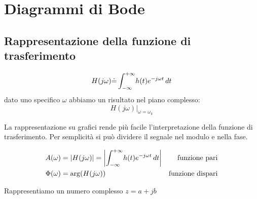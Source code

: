 
\chapter{Diagrammi di Bode}
\section{Rappresentazione della funzione di trasferimento}



\begin{equation}
	H(j\omega) \dot{=}\int_{-\infty}^{+\infty} \! h(t)e^{-j\omega t} \, d t
\end{equation}
dato uno specifico $\omega$ abbiamo un risultato nel piano complesso:
\[
	H(j\omega) \big\vert_{\omega = \omega_k}
\]


La rappresentazione su grafici rende più facile l'interpretazione della funzione di trasferimento. Per semplicità si può dividere il segnale nel modulo e nella fase.


\begin{align}
 A(\omega)&=\abs{H(j\omega)}=\Abs{\int_{-\infty}^{+\infty} \! h(t)e^{-j\omega t} \d t} &\text{funzione pari}\\	
 \Phi (\omega)&= \arg(H(j\omega)) & \text{funzione dispari}
\end{align}


Rappresentiamo un numero complesso $z=a+jb$

